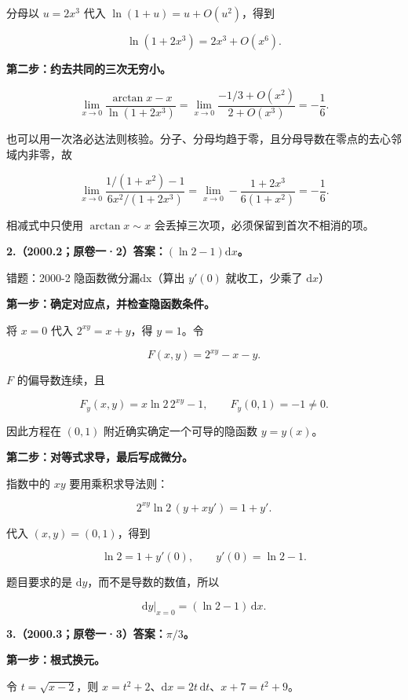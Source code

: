 \documentclass[UTF8,11pt,fontset=windows]{ctexart}
\begin{document}
分母以 $u=2x^3$ 代入 $\ln(1+u)=u+O(u^2)$，得到

$$
\ln(1+2x^3)=2x^3+O(x^6).
$$

\textbf{第二步：约去共同的三次无穷小。}

$$
\lim_{x\to0}\frac{\arctan x-x}{\ln(1+2x^3)}
=\lim_{x\to0}\frac{-1/3+O(x^2)}{2+O(x^3)}=-\frac16.
$$

也可以用一次洛必达法则核验。分子、分母均趋于零，且分母导数在零点的去心邻域内非零，故

$$
\lim_{x\to0}
\frac{1/(1+x^2)-1}{6x^2/(1+2x^3)}
=\lim_{x\to0}-\frac{1+2x^3}{6(1+x^2)}=-\frac16.
$$

相减式中只使用 $\arctan x\sim x$ 会丢掉三次项，必须保留到首次不相消的项。

\clearpage

\textbf{2.（2000.2；原卷一·2）答案：$(\ln2-1)\mathrm dx$。}

\begingroup\color{gray}错题：2000-2 隐函数微分漏dx（算出 $y'(0)$ 就收工，少乘了 $\mathrm dx$）\par\endgroup

\textbf{第一步：确定对应点，并检查隐函数条件。}

将 $x=0$ 代入 $2^{xy}=x+y$，得 $y=1$。令

$$
F(x,y)=2^{xy}-x-y.
$$

$F$ 的偏导数连续，且

$$
F_y(x,y)=x\ln2\,2^{xy}-1,
\qquad F_y(0,1)=-1\ne0.
$$

因此方程在 $(0,1)$ 附近确实确定一个可导的隐函数 $y=y(x)$。

\textbf{第二步：对等式求导，最后写成微分。}

指数中的 $xy$ 要用乘积求导法则：

$$
2^{xy}\ln2\,(y+xy')=1+y'.
$$

代入 $(x,y)=(0,1)$，得到

$$
\ln2=1+y'(0),\qquad y'(0)=\ln2-1.
$$

题目要求的是 $\mathrm dy$，而不是导数的数值，所以

$$
\boxed{\left.\mathrm dy\right|_{x=0}=(\ln2-1)\,\mathrm dx.}
$$

\clearpage

\textbf{3.（2000.3；原卷一·3）答案：$\pi/3$。}

\textbf{第一步：根式换元。}

令 $t=\sqrt{x-2}$，则 $x=t^2+2$、$\mathrm dx=2t\,\mathrm dt$、$x+7=t^2+9$。
\end{document}
